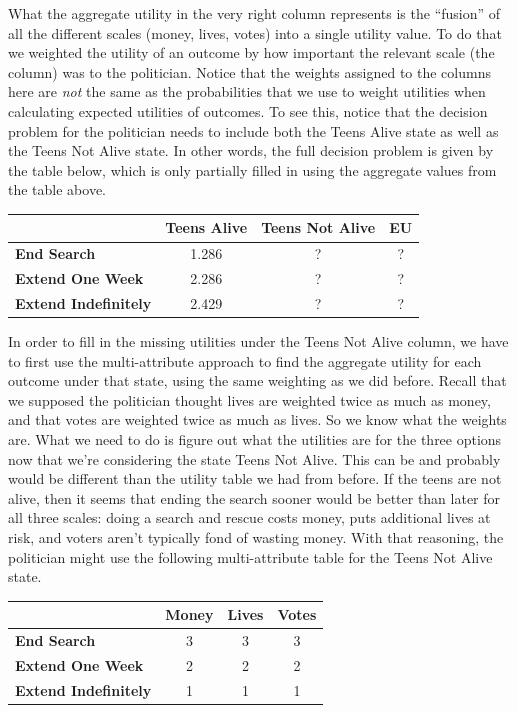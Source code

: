\documentclass[]{tufte-book}
\begin{document}
What the aggregate utility in the very right column represents is the ``fusion'' of all the different scales (money, lives, votes) into a single utility value. To do that we weighted the utility of an outcome by how important the relevant scale (the column) was to the politician. Notice that the weights assigned to the columns here are \emph{not} the same as the probabilities that we use to weight utilities when calculating expected utilities of outcomes. To see this, notice that the decision problem for the politician needs to include both the Teens Alive state as well as the Teens Not Alive state. In other words, the full decision problem is given by the table below, which is only partially filled in using the aggregate values from the table above.

\begin{longtable}[]{@{}lccc@{}}
\toprule
& Teens Alive & Teens Not Alive & EU\tabularnewline
\midrule
\endhead
\textbf{End Search} & 1.286 & ? & ?\tabularnewline
\textbf{Extend One Week} & 2.286 & ? & ?\tabularnewline
\textbf{Extend Indefinitely} & 2.429 & ? & ?\tabularnewline
\bottomrule
\end{longtable}

In order to fill in the missing utilities under the Teens Not Alive column, we have to first use the multi-attribute approach to find the aggregate utility for each outcome under that state, using the same weighting as we did before. Recall that we supposed the politician thought lives are weighted twice as much as money, and that votes are weighted twice as much as lives. So we know what the weights are. What we need to do is figure out what the utilities are for the three options now that we're considering the state Teens Not Alive. This can be and probably would be different than the utility table we had from before. If the teens are not alive, then it seems that ending the search sooner would be better than later for all three scales: doing a search and rescue costs money, puts additional lives at risk, and voters aren't typically fond of wasting money. With that reasoning, the politician might use the following multi-attribute table for the Teens Not Alive state.

\begin{longtable}[]{@{}lccc@{}}
\toprule
& Money & Lives & Votes\tabularnewline
\midrule
\endhead
\textbf{End Search} & 3 & 3 & 3\tabularnewline
\textbf{Extend One Week} & 2 & 2 & 2\tabularnewline
\textbf{Extend Indefinitely} & 1 & 1 & 1\tabularnewline
\bottomrule
\end{longtable}
\end{document}
